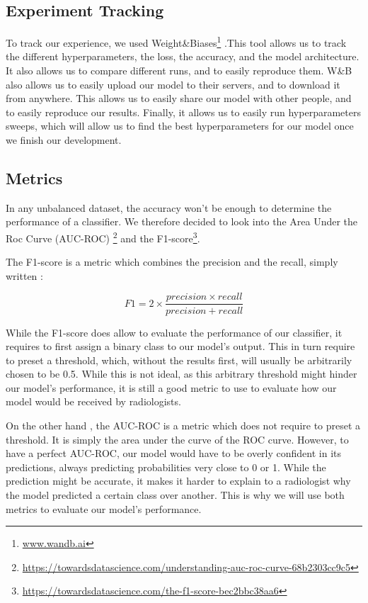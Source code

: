 \documentclass[11pt]{article}
\begin{document}
    \subsection{Experiment Tracking}

        To track our experience, we used Weight\&Biases\footnote{\url{www.wandb.ai}} .This tool allows us to track the different hyperparameters,
        the loss, the accuracy, and the model architecture. It also allows us to compare different runs, and to easily reproduce them.
        W\&B also allows us to easily upload our model to their servers, and to download it from anywhere. This
        allows us to easily share our model with other people, and to easily reproduce our results. Finally, it allows us
        to easily run hyperparameters sweeps, which will allow us to find the best hyperparameters for our model once we
        finish our development.

    \subsection{Metrics}
        In any unbalanced dataset, the accuracy won't be enough to determine the performance of a classifier.
        We therefore decided to look into the Area Under the Roc Curve (AUC-ROC) \footnote{\url{https://towardsdatascience.com/understanding-auc-roc-curve-68b2303cc9c5}}
        and the F1-score\footnote{\url{https://towardsdatascience.com/the-f1-score-bec2bbc38aa6}}.


        The F1-score is a metric which combines the precision and the recall, simply written :

        \begin{equation}
            F1 = 2 \times \frac{precision \times recall}{precision + recall}
        \end{equation}

        While the F1-score does allow to evaluate the performance of our classifier, it requires to first assign a
        binary class to our model's output. This in turn require to preset a threshold, which, without the results first, will usually be arbitrarily
        chosen to be 0.5. While this is not ideal, as this arbitrary threshold might hinder our model's performance,
        it is still a good metric to use to evaluate how our model would be received by radiologists.

        On the other hand , the AUC-ROC is a metric which does not require to preset a threshold. It is simply the area under the curve of the ROC curve.
        However, to have a perfect AUC-ROC, our model would have to be overly confident in its predictions, always
        predicting probabilities very close to 0 or 1. While the prediction might be accurate, it makes it harder to
        explain to a radiologist why the model predicted a certain class over another. This is why we will use both
        metrics to evaluate our model's performance.
\end{document}
